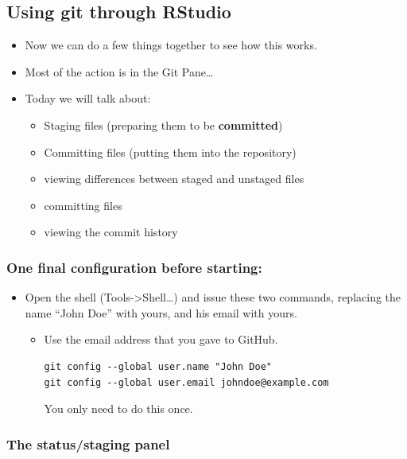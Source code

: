 \documentclass[]{book}
\providecommand{\tightlist}{%
  \setlength{\itemsep}{0pt}\setlength{\parskip}{0pt}}
\theoremstyle{definition}
\theoremstyle{definition}
\theoremstyle{remark}
\begin{document}
\subsection{Using git through RStudio}\label{git-thru-rstudio}

\begin{itemize}
\tightlist
\item
  Now we can do a few things together to see how this works.
\item
  Most of the action is in the Git Pane\ldots{}
\item
  Today we will talk about:

  \begin{itemize}
  \tightlist
  \item
    Staging files (preparing them to be \textbf{committed})
  \item
    Committing files (putting them into the repository)
  \item
    viewing differences between staged and unstaged files
  \item
    committing files
  \item
    viewing the commit history
  \end{itemize}
\end{itemize}

\subsubsection{One final configuration before
starting:}\label{one-final-configuration-before-starting}

\begin{itemize}
\tightlist
\item
  Open the shell (Tools-\textgreater{}Shell\ldots{}) and issue these two
  commands, replacing the name ``John Doe'' with yours, and his email
  with yours.

  \begin{itemize}
  \item
    Use the email address that you gave to GitHub.

\begin{verbatim}
git config --global user.name "John Doe"
git config --global user.email johndoe@example.com
\end{verbatim}

    You only need to do this once.
  \end{itemize}
\end{itemize}

\subsubsection{The status/staging panel}\label{the-statusstaging-panel}
\end{document}

